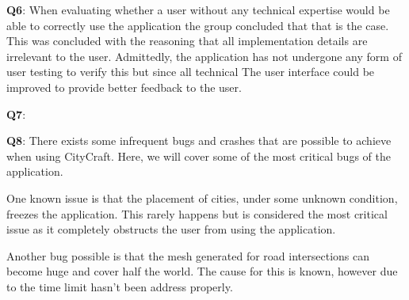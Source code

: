 \textbf{Q6}:
When evaluating whether a user without any technical expertise would be able to correctly use the application the group concluded that that is the case.
This was concluded with the reasoning that all implementation details are irrelevant to the user.
Admittedly, the application has not undergone any form of user testing to verify this but since all technical 
The user interface could be improved to provide better feedback to the user.

\textbf{Q7}:

\textbf{Q8}:
There exists some infrequent bugs and crashes that are possible to achieve when using CityCraft.
Here, we will cover some of the most critical bugs of the application.

One known issue is that the placement of cities, under some unknown condition, freezes the application.
This rarely happens but is considered the most critical issue as it completely obstructs the user from using the application.

Another bug possible is that the mesh generated for road intersections can become huge and cover half the world.
The cause for this is known, however due to the time limit hasn't been address properly.



